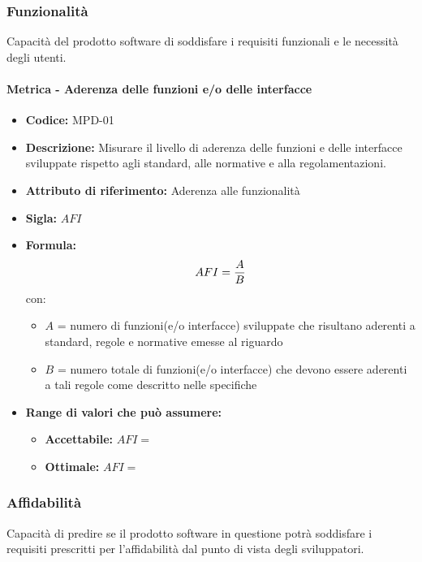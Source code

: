   \subsubsection{Funzionalità}
      Capacità del prodotto software di soddisfare i requisiti funzionali e le necessità degli utenti.

              \paragraph{Metrica - Aderenza delle funzioni e/o delle interfacce} 
              \begin{itemize}
          \item  \textbf{Codice:} MPD-01
        \item    \textbf{Descrizione:} Misurare il livello di aderenza delle funzioni e delle interfacce sviluppate rispetto agli standard, alle normative e alla regolamentazioni.
          \item  \textbf{Attributo di riferimento:} Aderenza alle funzionalità 
        \item    \textbf{Sigla:} $AFI$
         \item   \textbf{Formula:} $$AFI = {A \over B}$$
                con:
                \begin{itemize}
                    \item  $A$ = numero di funzioni(e/o interfacce) sviluppate che risultano aderenti a standard, regole e normative emesse al riguardo
                    \item  $B$ = numero totale di funzioni(e/o interfacce) che devono essere aderenti a tali regole come descritto nelle specifiche
                \end{itemize}

                \item \textbf{Range di valori che può assumere:}
                \begin{itemize}
                    \item \textbf{Accettabile:} $AFI = $
                    \item \textbf{Ottimale:} $AFI = $
                \end{itemize}
            \end{itemize}
              
  \subsubsection{Affidabilità} 
  Capacità di predire se il prodotto software in questione potrà soddisfare i requisiti prescritti per l'affidabilità dal punto di vista degli sviluppatori.
